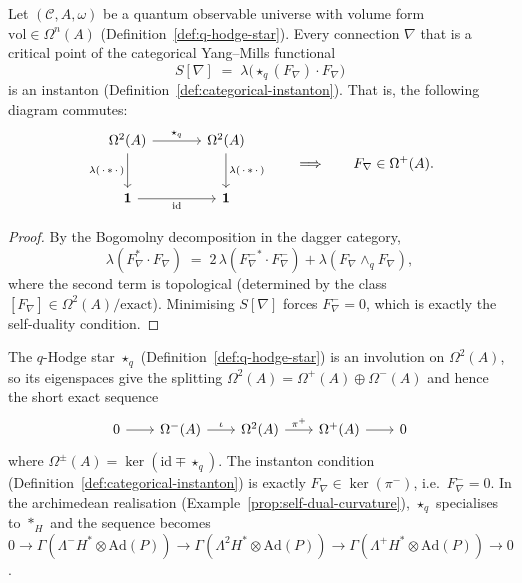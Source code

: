 \begin{proposition}
\label{prop:categorical-self-duality}
\leanok
Let $(\mathcal{C}, A, \omega)$ be a quantum observable universe
with volume form $\mathrm{vol} \in \Omega^n(A)$
(Definition~\ref{def:q-hodge-star}).  Every connection $\nabla$
that is a critical point of the categorical Yang--Mills functional
\[
  S[\nabla] \;=\; \lambda\!\bigl(\star_q(F_\nabla) \cdot F_\nabla\bigr)
\]
is an instanton (Definition~\ref{def:categorical-instanton}).  That is,
the following diagram commutes:
\begin{equation}\label{eq:self-duality-cd}
\begin{tikzcd}[row sep=2.5em, column sep=3.5em]
  \Omega^2(A) \ar[r, "\star_q"] \ar[d, "\lambda(\,\cdot\, {*}\, \cdot\,)"']
  & \Omega^2(A) \ar[d, "\lambda(\,\cdot\, {*}\, \cdot\,)"] \\
  \mathbf{1} \ar[r, "\mathrm{id}"']
  & \mathbf{1}
\end{tikzcd}
\qquad\Longrightarrow\qquad
F_\nabla \in \Omega^+(A).
\end{equation}
\end{proposition}

\begin{proof}
By the Bogomolny decomposition in the dagger category,
\[
  \lambda(F_\nabla^* \cdot F_\nabla)
  \;=\; 2\,\lambda({F_\nabla^-}^* \cdot F_\nabla^-)
        + \lambda(F_\nabla \wedge_q F_\nabla),
\]
where the second term is topological (determined by the class
$[F_\nabla] \in \Omega^2(A)/\mathrm{exact}$).  Minimising
$S[\nabla]$ forces $F_\nabla^- = 0$, which is exactly the
self-duality condition.
\end{proof}

\begin{remark}
\label{rem:self-dual-ses}
The $q$-Hodge star $\star_q$ (Definition~\ref{def:q-hodge-star}) is an
involution on $\Omega^2(A)$, so its eigenspaces give the splitting
$\Omega^2(A) = \Omega^+(A) \oplus \Omega^-(A)$ and hence
the short exact sequence
\begin{equation}\label{eq:self-dual-ses}
\begin{tikzcd}[column sep=2em]
  0 \ar[r]
  & \Omega^-(A)
    \ar[r, "\iota"]
  & \Omega^2(A)
    \ar[r, "\pi^+"]
  & \Omega^+(A)
    \ar[r]
  & 0
\end{tikzcd}
\end{equation}
where $\Omega^{\pm}(A) = \ker(\mathrm{id} \mp \star_q)$.
The instanton condition
(Definition~\ref{def:categorical-instanton}) is exactly
$F_\nabla \in \ker(\pi^-)$, i.e.\ $F_\nabla^- = 0$.
In the archimedean realisation (Example~\ref{prop:self-dual-curvature}),
$\star_q$ specialises to $*_H$ and the sequence becomes
$0 \to \Gamma(\Lambda^-\!H^* \otimes \mathrm{Ad}(P)) \to
\Gamma(\Lambda^2 H^* \otimes \mathrm{Ad}(P)) \to
\Gamma(\Lambda^+\!H^* \otimes \mathrm{Ad}(P)) \to 0$.
\end{remark}

